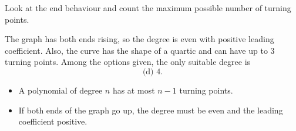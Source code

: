 \begin{hintbox}
Look at the end behaviour and count the maximum possible number of turning points.
\end{hintbox}

\begin{solution}
The graph has both ends rising, so the degree is even with positive leading coefficient.
Also, the curve has the shape of a quartic and can have up to $3$ turning points.
Among the options given, the only suitable degree is
\[
\boxed{\text{(d) }4.}
\]
\end{solution}

\begin{takeaways}
\begin{itemize}[leftmargin=*]
\item A polynomial of degree $n$ has at most $n-1$ turning points.
\item If both ends of the graph go up, the degree must be even and the leading coefficient positive.
\end{itemize}
\end{takeaways}
